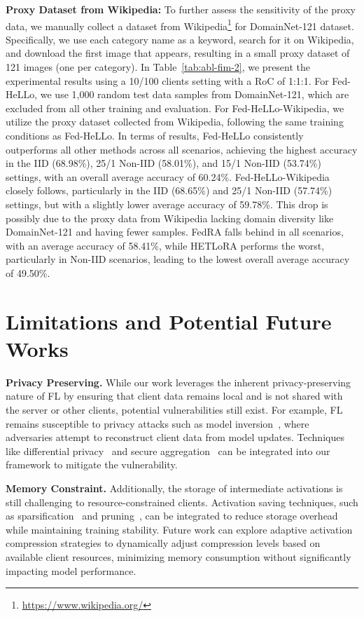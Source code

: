 \documentclass[lettersize,journal]{IEEEtran}
\begin{document}
\textbf{Proxy Dataset from Wikipedia:} To further assess the sensitivity of the proxy data, we manually collect a dataset from Wikipedia\footnote{\url{https://www.wikipedia.org/}} for DomainNet-121 dataset. Specifically, we use each category name as a keyword, search for it on Wikipedia, and download the first image that appears, resulting in a small proxy dataset of 121 images (one per category). In Table~\ref{tab:abl-fim-2}, we present the experimental results using a 10/100 clients setting with a RoC of 1:1:1. For Fed-HeLLo, we use 1,000 random test data samples from DomainNet-121, which are excluded from all other training and evaluation. For Fed-HeLLo-Wikipedia, we utilize the proxy dataset collected from Wikipedia, following the same training conditions as Fed-HeLLo. In terms of results, Fed-HeLLo consistently outperforms all other methods across all scenarios, achieving the highest accuracy in the IID (68.98\%), 25/1 Non-IID (58.01\%), and 15/1 Non-IID (53.74\%) settings, with an overall average accuracy of 60.24\%. Fed-HeLLo-Wikipedia closely follows, particularly in the IID (68.65\%) and 25/1 Non-IID (57.74\%) settings, but with a slightly lower average accuracy of 59.78\%. This drop is possibly due to the proxy data from Wikipedia lacking domain diversity like DomainNet-121 and having fewer samples. FedRA falls behind in all scenarios, with an average accuracy of 58.41\%, while HETLoRA performs the worst, particularly in Non-IID scenarios, leading to the lowest overall average accuracy of 49.50\%.

\section{Limitations and Potential Future Works}\label{sec:limitation}
{\textbf{Privacy Preserving.} While our work leverages the inherent privacy-preserving nature of FL by ensuring that client data remains local and is not shared with the server or other clients, potential vulnerabilities still exist. For example, FL remains susceptible to privacy attacks such as model inversion~\cite{fredrikson2015model}, where adversaries attempt to reconstruct client data from model updates. Techniques like differential privacy~\cite{dwork2006differential} and secure aggregation~\cite{bonawitz2016practical} can be integrated into our framework to mitigate the vulnerability.}

{\textbf{Memory Constraint.} Additionally, the storage of intermediate activations is still challenging to resource-constrained clients. Activation saving techniques, such as sparsification~\cite{rao2021dynamicvit} and pruning~\cite{zhu2017prune}, can be integrated to reduce storage overhead while maintaining training stability. Future work can explore adaptive activation compression strategies to dynamically adjust compression levels based on available client resources, minimizing memory consumption without significantly impacting model performance.}
\end{document}
